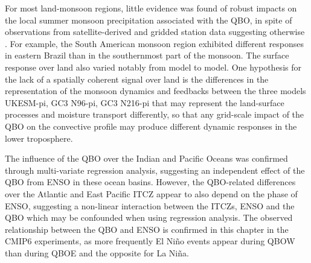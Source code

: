 %

For most land-monsoon regions, little evidence was found of robust impacts on the local summer monsoon precipitation associated with the QBO, in spite of observations from satellite-derived and gridded station data suggesting otherwise \citep{collimore2003,liess2012,gray2018,lee2019}. For example,  the South American monsoon region exhibited different responses in eastern Brazil than in the southernmost part of the monsoon. The surface response over land also varied notably from model to model.
One hypothesis for the lack of a spatially coherent signal over land is the differences in the representation of the monsoon dynamics and feedbacks between the three models UKESM-pi, GC3 N96-pi, GC3 N216-pi that may represent the land-surface processes and moisture transport differently, so that any grid-scale impact of the QBO on the convective profile may produce different dynamic responses in the lower troposphere. 

The influence of the QBO over the Indian and Pacific Oceans was confirmed through multi-variate regression analysis, suggesting an independent effect of the QBO from ENSO in these ocean basins. 
However, the QBO-related differences over the Atlantic and East Pacific ITCZ appear to also depend on the phase of ENSO, suggesting a non-linear interaction between the ITCZs, ENSO and the QBO which may be confounded when using regression analysis.  
 The observed relationship between the QBO and ENSO is confirmed in this chapter in the CMIP6 experiments, as more frequently El Niño events appear during QBOW than during QBOE and the opposite for La Niña. 
 
